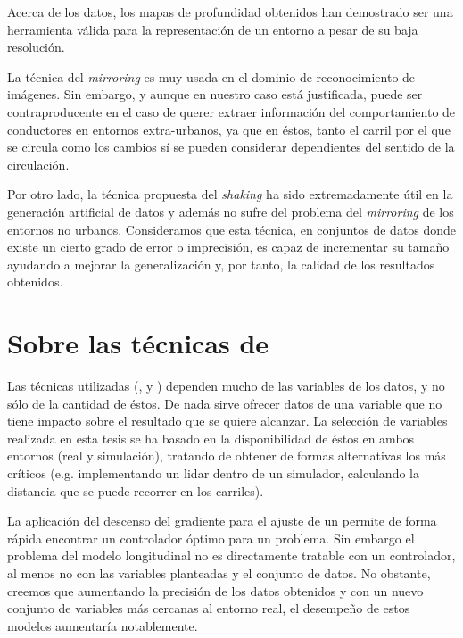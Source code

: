 Acerca de los datos, los mapas de profundidad obtenidos han demostrado ser una herramienta válida para la representación de un entorno a pesar de su baja resolución.

La técnica del \textit{mirroring} es muy usada en el dominio de reconocimiento de imágenes. Sin embargo, y aunque en nuestro caso está justificada, puede ser contraproducente en el caso de querer extraer información del comportamiento de conductores en entornos extra-urbanos, ya que en éstos, tanto el carril por el que se circula como los cambios sí se pueden considerar dependientes del sentido de la circulación.

Por otro lado, la técnica propuesta del \textit{shaking} ha sido extremadamente útil en la generación artificial de datos y además no sufre del problema del \textit{mirroring} de los entornos no urbanos. Consideramos que esta técnica, en conjuntos de datos donde existe un cierto grado de error o imprecisión, es capaz de incrementar su tamaño ayudando a mejorar la generalización y, por tanto, la calidad de los resultados obtenidos.

\section{Sobre las técnicas de }

Las técnicas utilizadas (,  y ) dependen mucho de las variables de los datos, y no sólo de la cantidad de éstos. De nada sirve ofrecer datos de una variable que no tiene impacto sobre el resultado que se quiere alcanzar. La selección de variables realizada en esta tesis se ha basado en la disponibilidad de éstos en ambos entornos (real y simulación), tratando de obtener de formas alternativas los más críticos (e.g. implementando un \acrshort{lidar} dentro de un simulador, calculando la distancia que se puede recorrer en los carriles).

La aplicación del descenso del gradiente para el ajuste de un  permite de forma rápida encontrar un controlador óptimo para un problema. Sin embargo el problema del modelo longitudinal no es directamente tratable con un controlador, al menos no con las variables planteadas y el conjunto de datos. No obstante, creemos que aumentando la precisión de los datos obtenidos y con un nuevo conjunto de variables más cercanas al entorno real, el desempeño de estos modelos aumentaría notablemente.

